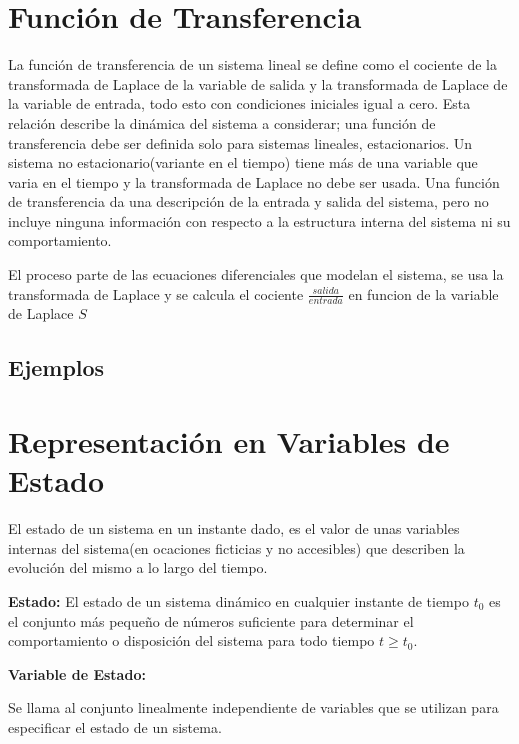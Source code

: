 \documentclass[12pt]{article}
\begin{document}
\section{Función de Transferencia}
La función de transferencia de un sistema lineal se define como el cociente de la transformada de Laplace de la variable de salida y la transformada de Laplace de la variable de entrada, todo esto con condiciones iniciales igual a cero.
Esta relación describe la dinámica del sistema a considerar; una función de transferencia debe ser definida solo para sistemas lineales, estacionarios. Un sistema no estacionario(variante en el tiempo) tiene más de una variable que varia en el tiempo y la transformada de Laplace no debe ser usada. Una función de transferencia da una descripción de la entrada y salida del sistema, pero no incluye ninguna información con respecto a la estructura interna del sistema ni su comportamiento.\cite{dorf2005sistemas}

\vspace{5mm}
El proceso parte de las ecuaciones diferenciales que modelan el sistema, se usa la transformada de Laplace y se calcula el cociente $\frac{salida}{entrada}$ en funcion de la variable de Laplace $S$

\subsection{Ejemplos}

\section{Representación en Variables de Estado}
El estado de un sistema en un instante dado, es el valor de unas variables internas del sistema(en ocaciones ficticias y no accesibles) que describen la evolución del mismo a lo largo del tiempo.

\textbf{Estado:}
\vspace{5mm}
El estado de un sistema dinámico en cualquier instante de tiempo $t_{0}$ es el conjunto más pequeño de números suficiente para determinar el comportamiento o disposición del sistema para todo tiempo $t\geq t_{0}$.

\vspace{5mm}
\textbf{Variable de Estado:}
\vspace{5mm}

Se llama al conjunto linealmente independiente de variables que se utilizan para especificar el estado de un sistema.
\end{document}
